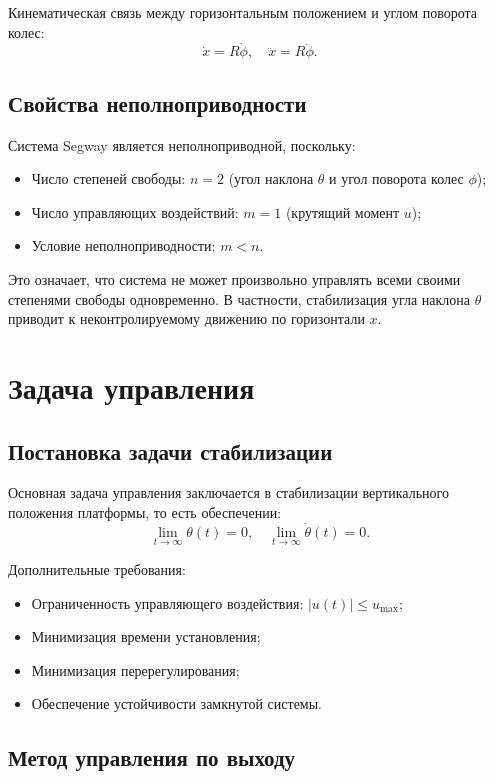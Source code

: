 Кинематическая связь между горизонтальным положением и углом поворота колес:
\[
\dot{x} = R \dot{\phi}, \quad \ddot{x} = R \ddot{\phi}.
\]

\subsection{Свойства неполноприводности}

Система Segway является неполноприводной, поскольку:
\begin{itemize}
    \item Число степеней свободы: $n = 2$ (угол наклона $\theta$ и угол поворота колес $\phi$);
    \item Число управляющих воздействий: $m = 1$ (крутящий момент $u$);
    \item Условие неполноприводности: $m < n$.
\end{itemize}

Это означает, что система не может произвольно управлять всеми своими степенями свободы одновременно. В частности, стабилизация угла наклона $\theta$ приводит к неконтролируемому движению по горизонтали $x$.

\section{Задача управления}

\subsection{Постановка задачи стабилизации}

Основная задача управления заключается в стабилизации вертикального положения платформы, то есть обеспечении:
\[
\lim_{t \to \infty} \theta(t) = 0, \quad \lim_{t \to \infty} \dot{\theta}(t) = 0.
\]

Дополнительные требования:
\begin{itemize}
    \item Ограниченность управляющего воздействия: $|u(t)| \leq u_{\max}$;
    \item Минимизация времени установления;
    \item Минимизация перерегулирования;
    \item Обеспечение устойчивости замкнутой системы.
\end{itemize}

\subsection{Метод управления по выходу}

